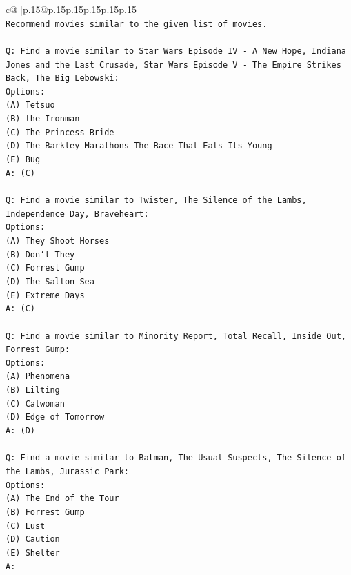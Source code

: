 \documentclass{article}
\begin{document}
{\begin{supertabular}{c@{$\;$}|p{.15\linewidth}@{}p{.15\linewidth}p{.15\linewidth}p{.15\linewidth}p{.15\linewidth}p{.15\linewidth}}
{{{\\ 
\texttt{Recommend movies similar to the given list of movies.} \\
\\ 
\texttt{Q: Find a movie similar to Star Wars Episode IV {-} A New Hope, Indiana Jones and the Last Crusade, Star Wars Episode V {-} The Empire Strikes Back, The Big Lebowski:} \\
\texttt{Options:} \\
\texttt{(A) Tetsuo} \\
\texttt{(B) the Ironman} \\
\texttt{(C) The Princess Bride} \\
\texttt{(D) The Barkley Marathons The Race That Eats Its Young} \\
\texttt{(E) Bug} \\
\texttt{A: (C)} \\
\\ 
\texttt{Q: Find a movie similar to Twister, The Silence of the Lambs, Independence Day, Braveheart:} \\
\texttt{Options:} \\
\texttt{(A) They Shoot Horses} \\
\texttt{(B) Don't They} \\
\texttt{(C) Forrest Gump} \\
\texttt{(D) The Salton Sea} \\
\texttt{(E) Extreme Days} \\
\texttt{A: (C)} \\
\\ 
\texttt{Q: Find a movie similar to Minority Report, Total Recall, Inside Out, Forrest Gump:} \\
\texttt{Options:} \\
\texttt{(A) Phenomena} \\
\texttt{(B) Lilting} \\
\texttt{(C) Catwoman} \\
\texttt{(D) Edge of Tomorrow} \\
\texttt{A: (D)} \\
\\ 
\texttt{Q: Find a movie similar to Batman, The Usual Suspects, The Silence of the Lambs, Jurassic Park:} \\
\texttt{Options:} \\
\texttt{(A) The End of the Tour} \\
\texttt{(B) Forrest Gump} \\
\texttt{(C) Lust} \\
\texttt{(D) Caution} \\
\texttt{(E) Shelter} \\
\texttt{A:} \\
            }
        }
    }
     \\ \\


\end{supertabular}}
\end{document}
